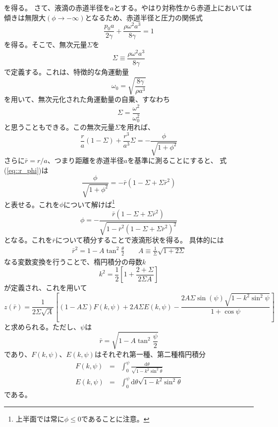 \documentclass{jarticle}
\newcommand{\diff}{\mathrm d}
\begin{document}
を得る。
さて、液滴の赤道半径を$a$とする。やはり対称性から赤道上においては傾きは無限大$(\phi\rightarrow -\infty)$となるため、赤道半径と圧力の関係式
\begin{equation}
\frac{p_0 a}{2\gamma} + \frac{\rho \omega^2 a^3}{8\gamma} =1
\end{equation}
を得る。そこで、無次元量$\Sigma$を
\begin{equation}
\Sigma \equiv \frac{\rho \omega^2 a^3}{8\gamma}
\end{equation}
で定義する。これは、特徴的な角運動量
\begin{equation}
\omega_0 = \sqrt{\frac{8 \gamma}{\rho a^3}}
\end{equation}
を用いて、無次元化された角運動量の自乗、すなわち
\begin{equation}
\Sigma = \frac{\omega^2}{\omega_0^2}
\end{equation}
と思うこともできる。この無次元量$\Sigma$を用れば、
\begin{equation}
\frac{r}{a} (1-\Sigma) + \frac{r^3}{a^3} \Sigma = - \frac{\phi}{\sqrt{1+\phi^2}}
\end{equation}
さらに$\bar{r} = r/a$、つまり距離を赤道半径$a$を基準に測ることにすると、
式(\ref{eq::r_phi})は
\begin{equation}
\frac{\phi}{\sqrt{1+\phi^2}} =-\bar{r} (1-\Sigma + \Sigma \bar{r}^2)
\end{equation}
と表せる。これを$\phi$について解けば\footnote{上半面では常に$\phi \leq 0$であることに注意。}
\begin{equation}
\phi = - \frac{\bar{r} (1 - \Sigma +\Sigma \bar{r}^2)}{\sqrt{1 - \bar{r}^2(1-\Sigma +\Sigma \bar{r}^2)^2}} \label{eq::phi}
\end{equation}
となる。これを$\bar{r}$について積分することで液滴形状を得る。
具体的には
\begin{eqnarray}
\bar{r}^2 = 1 - A \tan^2 \frac{\theta}{2} \qquad A \equiv \frac{1}{\Sigma}  \sqrt{1+2\Sigma}
\end{eqnarray}
なる変数変換を行うことで、楕円積分の母数$k$
\begin{equation}
k^2 = \frac{1}{2} \left[ 1+ \frac{2+\Sigma}{2\Sigma A} \right]
\end{equation}
が定義され、これを用いて
\begin{equation}
z(\bar{r}) = \frac{1}{2 \Sigma \sqrt{A}} \left[
(1-A\Sigma) F(k,\psi) + 2A\Sigma E(k,\psi) -\frac{2A\Sigma \sin(\psi) \sqrt{1-k^2 \sin^2 \psi}}{1+\cos \psi}
\right]
\end{equation}
と求められる。ただし、$\psi$は
\begin{equation}
\bar{r} = \sqrt{1 - A\tan^2 \frac{\psi}{2}}
\end{equation}
であり、$F(k,\psi)$、$E(k,\psi)$はそれぞれ第一種、第二種楕円積分
\begin{eqnarray}
F(k,\psi) &=& \int_0^\psi \frac{\diff \theta}{\sqrt{1-k^2 \sin^2 \theta}}\\
E(k,\psi) &=& \int_0^\psi  \diff \theta \sqrt{1-k^2 \sin^2 \theta}
\end{eqnarray}
である。
\end{document}
